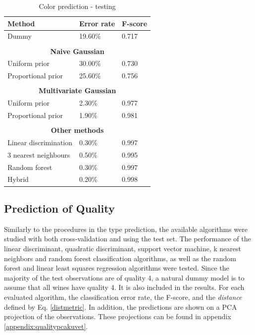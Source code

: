 \documentclass[twoside]{article}
\begin{document}
\begin{multicols}{2}
\begin{table}[H]
\caption{Color prediction - testing}
\label{table:color_testing}
\begin{tabular}{lll}
\textbf{Method} & \textbf{Error rate} & \textbf{F-score}\\
\midrule
Dummy & 19.60\% & 0.717 \\
\\
\multicolumn{3}{c}{\textbf{Naive Gaussian}} \\
Uniform prior & 30.00\% & 0.730 \\
Proportional prior & 25.60\% & 0.756 \\
\\
\multicolumn{3}{c}{\textbf{Multivariate Gaussian}} \\
Uniform prior & 2.30\% & 0.977 \\
Proportional prior & 1.90\% & 0.981 \\
\\
\multicolumn{3}{c}{\textbf{Other methods}} \\
Linear discrimination & 0.30\% & 0.997 \\
$3$ nearest neighbours & 0.50\% & 0.995 \\
Random forest & 0.30\% & 0.997 \\
Hybrid & 0.20\% & 0.998 \\

\end{tabular}
\end{table}

\subsection{Prediction of Quality}

Similarly to the procedures in the type prediction, the available algorithms were studied with both cross-validation and using the test set. 
The performance of the linear discriminant, quadratic discriminant, support vector machine, k nearest neighbors and random forest
classification algorithms, as well as the random forest and linear least squares regression algorithms were tested.
Since the majority of the test observations are of quality 4, a natural dummy model is to assume that all wines have quality 4.
It is also included in the results.
For each evaluated algorithm, the classification error rate, the F-score, and the \emph{distance} defined by Eq. \eqref{distmetric}. In addition, the predictions are shown on a PCA projection
of the observations. These projections can be found in appendix \ref{appendix:qualitypcakuvet}.


\end{multicols}
\end{document}
